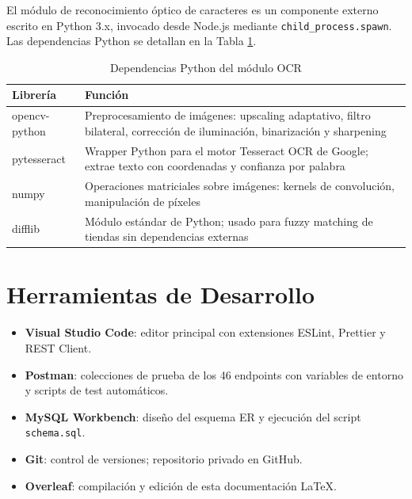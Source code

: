 El módulo de reconocimiento óptico de caracteres es un componente externo escrito en Python 3.x, invocado desde Node.js mediante \texttt{child\_process.spawn}. Las dependencias Python se detallan en la Tabla \ref{tab:deps-ocr}.

\begin{longtable}{>{\ttfamily}p{3.5cm} p{9.5cm}}
  \caption{Dependencias Python del módulo OCR}
  \label{tab:deps-ocr} \\
  \toprule
  \textbf{Librería} & \textbf{Función} \\
  \midrule
  opencv-python & Preprocesamiento de imágenes: upscaling adaptativo, filtro bilateral, corrección de iluminación, binarización y sharpening \cite{opencv_docs} \\
  \addlinespace
  pytesseract   & Wrapper Python para el motor Tesseract OCR de Google; extrae texto con coordenadas y confianza por palabra \cite{tesseract_docs} \\
  \addlinespace
  numpy         & Operaciones matriciales sobre imágenes: kernels de convolución, manipulación de píxeles \cite{numpy_docs} \\
  \addlinespace
  difflib       & Módulo estándar de Python; usado para fuzzy matching de tiendas sin dependencias externas \\
  \bottomrule
\end{longtable}

\section{Herramientas de Desarrollo}

\begin{itemize}[leftmargin=1.5cm]
  \item \textbf{Visual Studio Code}: editor principal con extensiones ESLint, Prettier y REST Client.
  \item \textbf{Postman}: colecciones de prueba de los 46 endpoints con variables de entorno y scripts de test automáticos.
  \item \textbf{MySQL Workbench}: diseño del esquema ER y ejecución del script \texttt{schema.sql}.
  \item \textbf{Git}: control de versiones; repositorio privado en GitHub.
  \item \textbf{Overleaf}: compilación y edición de esta documentación LaTeX.
\end{itemize}
